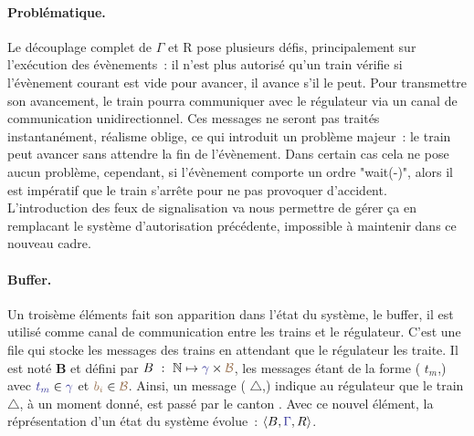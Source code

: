 \documentclass[oneside, a4paper, 11pt]{book}
\newcommand{\nats}{\ensuremath{\mathbb{N}}}
\newcommand{\trainFmt}[1]{{\color{traincolor} #1}}
\newcommand{\posFmt}[1]{{\color{poscolor}{#1}}}
\begin{document}
\paragraph{Problématique.} Le découplage complet de \trainFmt{$\Gamma$} et R pose plusieurs défis, principalement sur l'exécution des évènements~: il n'est plus autorisé qu'un train vérifie si l'évènement courant est vide pour avancer, il avance s'il le peut.
Pour transmettre son avancement, le train pourra communiquer avec le régulateur via un canal de communication unidirectionnel. Ces messages ne seront pas traités instantanément, réalisme oblige, ce qui introduit un problème majeur~: le train peut avancer sans attendre la fin de l'évènement.
Dans certain cas cela ne pose aucun problème, cependant, si l'évènement comporte un ordre "wait(-)", alors il est impératif que le train s'arrête pour ne pas provoquer d'accident.
L'introduction des feux de signalisation va nous permettre de gérer ça en remplacant le système d'autorisation précédente, impossible à maintenir dans ce nouveau cadre.

\paragraph{Buffer.} Un troisème éléments fait son apparition dans l'état du système, le buffer, il est utilisé comme canal de communication entre les trains et le régulateur. C'est une file qui stocke les messages des trains en attendant que le régulateur les traite. 
Il est noté \textbf{B} et défini par  $B~:~\nats \mapsto \trainFmt{\gamma} \times \posFmt{\mathcal{B}}$, les messages étant de la forme (\trainFmt{$t_m$},\posFmt{$b_i$}) avec $\trainFmt{t_m} \in \trainFmt{\gamma}$ et $\posFmt{b_i} \in \posFmt{\mathcal{B}}$.
Ainsi, un message (\trainFmt{$\triangle$},\posFmt{8}) indique au régulateur que le train \trainFmt{$\triangle$}, à un moment donné, est passé par le canton \posFmt{8}. Avec ce nouvel élément, la réprésentation d'un état du système évolue~: $\langle B, \trainFmt{\Gamma}, R\rangle$.
\end{document}
